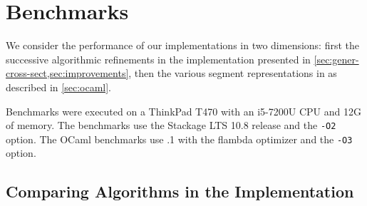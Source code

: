 \section{Benchmarks}
\label{sec:bench}


We consider the performance of our implementations in two dimensions:
first the successive algorithmic refinements in the \haskell
implementation presented in \cref{sec:gener-cross-sect,sec:improvements},
then the various segment representations in \ocaml
as described in \cref{sec:ocaml}.

Benchmarks were executed on a ThinkPad T470 with an i5-7200U CPU and 12G of memory.
The \haskell benchmarks use the Stackage LTS 10.8 release and the \texttt{-O2} option.
The OCaml benchmarks use .1 with the flambda optimizer and the
\texttt{-O3} option.

\subsection{Comparing Algorithms in the \haskell Implementation}

